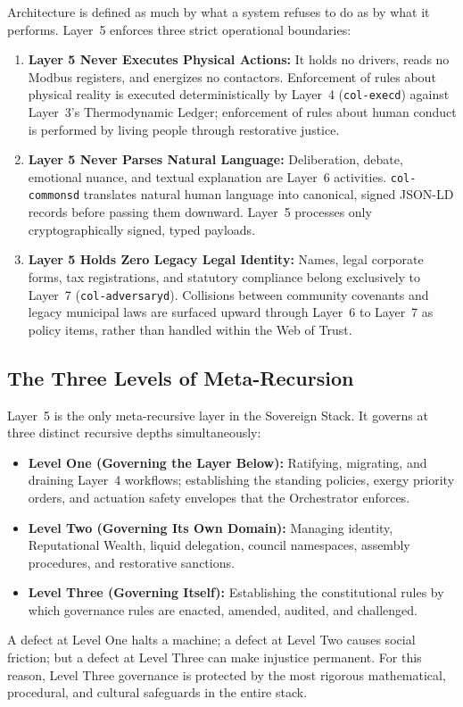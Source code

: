 Architecture is defined as much by what a system refuses to do as by what it performs. Layer~5 enforces three strict operational boundaries:
\begin{enumerate}
  \item \textbf{Layer 5 Never Executes Physical Actions:} It holds no drivers, reads no Modbus registers, and energizes no contactors. Enforcement of rules about physical reality is executed deterministically by Layer~4 (\texttt{col-execd}) against Layer~3's Thermodynamic Ledger; enforcement of rules about human conduct is performed by living people through restorative justice.
  \item \textbf{Layer 5 Never Parses Natural Language:} Deliberation, debate, emotional nuance, and textual explanation are Layer~6 activities. \texttt{col-commonsd} translates natural human language into canonical, signed JSON-LD records before passing them downward. Layer~5 processes only cryptographically signed, typed payloads.
  \item \textbf{Layer 5 Holds Zero Legacy Legal Identity:} Names, legal corporate forms, tax registrations, and statutory compliance belong exclusively to Layer~7 (\texttt{col-adversaryd}). Collisions between community covenants and legacy municipal laws are surfaced upward through Layer~6 to Layer~7 as policy items, rather than handled within the Web of Trust.
\end{enumerate}

\subsection{The Three Levels of Meta-Recursion}

Layer~5 is the only meta-recursive layer in the Sovereign Stack. It governs at three distinct recursive depths simultaneously:
\begin{itemize}
  \item \textbf{Level One (Governing the Layer Below):} Ratifying, migrating, and draining Layer~4 workflows; establishing the standing policies, exergy priority orders, and actuation safety envelopes that the Orchestrator enforces.
  \item \textbf{Level Two (Governing Its Own Domain):} Managing identity, Reputational Wealth, liquid delegation, council namespaces, assembly procedures, and restorative sanctions.
  \item \textbf{Level Three (Governing Itself):} Establishing the constitutional rules by which governance rules are enacted, amended, audited, and challenged.
\end{itemize}
A defect at Level One halts a machine; a defect at Level Two causes social friction; but a defect at Level Three can make injustice permanent. For this reason, Level Three governance is protected by the most rigorous mathematical, procedural, and cultural safeguards in the entire stack.

